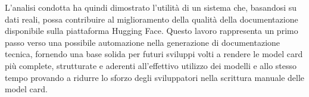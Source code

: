 \documentclass{article}
\begin{document}
L’analisi condotta ha quindi dimostrato l’utilità di un sistema che, basandosi su dati reali, possa contribuire al miglioramento della qualità della documentazione disponibile sulla piattaforma Hugging Face. Questo lavoro rappresenta un primo passo verso una possibile automazione nella generazione di documentazione tecnica, fornendo una base solida per futuri sviluppi volti a rendere le model card più complete, strutturate e aderenti all’effettivo utilizzo dei modelli e allo stesso tempo provando a ridurre lo sforzo degli sviluppatori nella scrittura manuale delle model card.



\appendix
\end{document}
